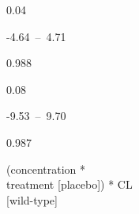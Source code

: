 \documentclass[
  letterpaper,
  DIV=11,
  numbers=noendperiod]{scrartcl}
\begin{document}
\begin{table}
\begin{minipage}[t]{\linewidth}
{0.04

}

\end{minipage}%
\newline
\begin{minipage}[t]{\linewidth}

{\centering 

-4.64~--~4.71

}

\end{minipage}%
\newline
\begin{minipage}[t]{\linewidth}

{\centering 

0.988

}

\end{minipage}%
\newline
\begin{minipage}[t]{\linewidth}

{\centering 

0.08

}

\end{minipage}%
\newline
\begin{minipage}[t]{\linewidth}

{\centering 

-9.53~--~9.70

}

\end{minipage}%
\newline
\begin{minipage}[t]{\linewidth}

{\centering 

0.987

}

\end{minipage}%
\newline
\begin{minipage}[t]{\linewidth}

{\centering 

(concentration *\\
treatment {[}placebo{]}) * CL\\
{[}wild-type{]}

}

\end{minipage}%
\newline
\begin{minipage}[t]{\linewidth}


\end{minipage}
\end{table}
\end{document}
